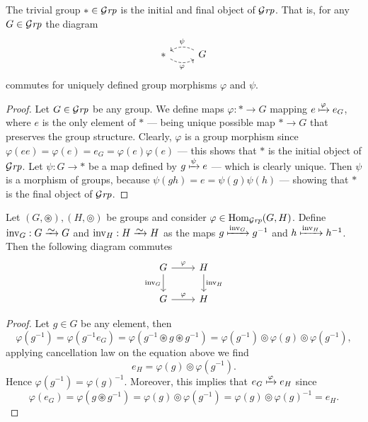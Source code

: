 \begin{proposition}
  The trivial group \(* \in {\mathcal{G}\textit{rp}}\) is the initial and final object of \({\mathcal{G}\textit{rp}}\).
  That is, for any \(G \in {\mathcal{G}\textit{rp}}\) the diagram
  \[
    \begin{tikzcd}
      * \ar[r, dashed, bend right, swap, "\varphi"]
      &G \ar[l, dashed, bend right, swap, "\psi"]
    \end{tikzcd}
  \]
  commutes for uniquely defined group morphisms \(\varphi\) and \(\psi\).
\end{proposition}

\begin{proof}
  Let \(G \in {\mathcal{G}\textit{rp}}\) be any group. We define maps \(\varphi: * \to G\) mapping
  \(e \xmapsto\varphi e_G\), where \(e\) is the only element of \(*\) --- being
  unique possible map \(* \to G\) that preserves the group structure. Clearly,
  \(\varphi\) is a group morphism since \(\varphi(e e) = \varphi(e) = e_G =
  \varphi(e) \varphi(e)\) --- this shows that \(*\) is the initial object of
  \({\mathcal{G}\textit{rp}}\). Let \(\psi: G \to *\) be a map defined by \(g \xmapsto\psi e\) ---
  which is clearly unique. Then \(\psi\) is a morphism of groups, because
  \(\psi(g h) = e = \psi(g) \psi(h)\) --- showing that \(*\) is the final object
  of \({\mathcal{G}\textit{rp}}\).
\end{proof}

\begin{proposition}
  Let \((G, \circledast), (H, \circledcirc)\) be groups and consider \(\varphi \in
  \operatorname{Hom}_{\mathcal{G}\textit{rp}}(G, H)\). Define \(\operatorname{inv}_G: G \isoto G\) and
  \(\operatorname{inv}_H: H \isoto H\) as the maps \(g \xmapsto
  {\operatorname{inv}_G} g^{-1}\) and \(h \xmapsto {\operatorname{inv}_H}
  h^{-1}\). Then the following diagram commutes
  \[
    \begin{tikzcd}
      G \ar[r, "\varphi"]
      \ar[d, swap, "\operatorname{inv}_G"]
      &H \ar[d, "\operatorname{inv}_H"] \\
      G \ar[r, "\varphi"] &H
    \end{tikzcd}
  \]
\end{proposition}

\begin{proof}
  Let \(g \in G\) be any element, then
  \[
    \varphi(g^{-1}) = \varphi(g^{-1} e_G) = \varphi(g^{-1} \circledast g
    \circledast g^{-1}) = \varphi(g^{-1}) \circledcirc \varphi(g) \circledcirc
    \varphi(g^{-1}),
  \]
  applying cancellation law on the equation above we find
  \[
    e_H = \varphi(g) \circledcirc \varphi(g^{-1}).
  \]
  Hence \(\varphi(g^{-1}) = {\varphi(g)}^{-1}\). Moreover, this implies that \(e_G
  \xmapsto \varphi e_H\) since
  \[
    \varphi(e_G) = \varphi(g \circledast g^{-1}) = \varphi(g) \circledcirc
    \varphi(g^{-1}) = \varphi(g) \circledcirc {\varphi(g)}^{-1} = e_H.
  \]
\end{proof}


